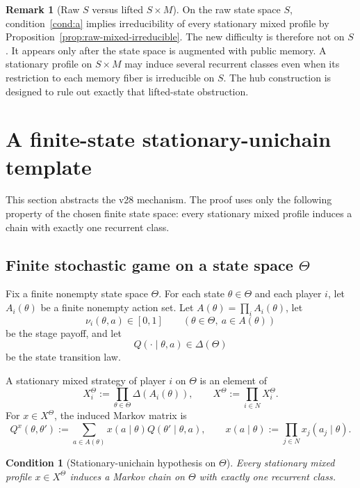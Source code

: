 \documentclass[11pt]{article}
\newtheorem{condition}[theorem]{Condition}
\theoremstyle{definition}
\newtheorem{remark}[theorem]{Remark}
\newcommand{\1}{\mathbf{1}}
\begin{document}
\begin{remark}[Raw $S$ versus lifted $S\times M$]\label{rem:raw-vs-aug}
On the raw state space $S$, condition~\ref{cond:a} implies irreducibility of every stationary mixed profile by Proposition~\ref{prop:raw-mixed-irreducible}. The new difficulty is therefore not on $S$. It appears only after the state space is augmented with public memory. A stationary profile on $S\times M$ may induce several recurrent classes even when its restriction to each memory fiber is irreducible on $S$. The hub construction is designed to rule out exactly that lifted-state obstruction.
\end{remark}

\section{A finite-state stationary-unichain template}\label{sec:template}

This section abstracts the v28 mechanism. The proof uses only the following property of the chosen finite state space: every stationary mixed profile induces a chain with exactly one recurrent class.

\subsection{Finite stochastic game on a state space $\Theta$}

Fix a finite nonempty state space $\Theta$. For each state $\theta\in\Theta$ and each player $i$, let $A_i(\theta)$ be a finite nonempty action set. Let $A(\theta)=\prod_i A_i(\theta)$, let
\[
\nu_i(\theta,a)\in[0,1]
\qquad (\theta\in\Theta,\ a\in A(\theta))
\]
be the stage payoff, and let
\[
Q(\cdot\mid \theta,a)\in\Delta(\Theta)
\]
be the state transition law.

A stationary mixed strategy of player $i$ on $\Theta$ is an element of
\[
X_i^\Theta:=\prod_{\theta\in\Theta}\Delta(A_i(\theta)),
\qquad
X^\Theta:=\prod_{i\in N}X_i^\Theta.
\]
For $x\in X^\Theta$, the induced Markov matrix is
\[
Q^x(\theta,\theta')
:=\sum_{a\in A(\theta)}x(a\mid \theta)Q(\theta'\mid \theta,a),
\qquad
x(a\mid \theta):=\prod_{j\in N}x_j(a_j\mid \theta).
\]

\begin{condition}[Stationary-unichain hypothesis on $\Theta$]\label{cond:theta-unichain}
Every stationary mixed profile $x\in X^\Theta$ induces a Markov chain on $\Theta$ with exactly one recurrent class.
\end{condition}
\end{document}
